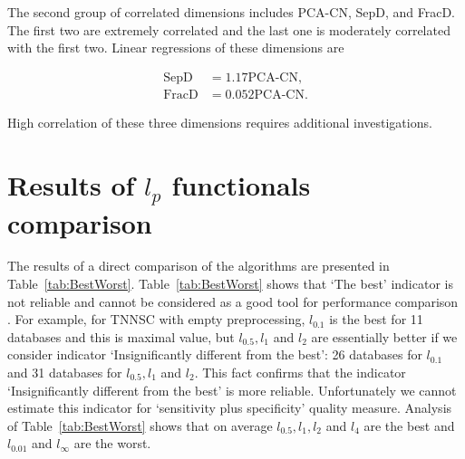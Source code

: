 \documentclass[entropy,article,submit,moreauthors,pdftex]{Definitions/mdpi}
\begin{document}
The second group of correlated dimensions includes PCA-CN, SepD, and FracD. The first two are extremely correlated and the last one is moderately correlated with the first two. Linear regressions of these dimensions are

\begin{equation*}
\begin{split}
\text{SepD} &= 1.17 \text{PCA-CN},\\
\text{FracD} &= 0.052 \text{PCA-CN}.
\end{split}
\end{equation*}

High correlation of these three dimensions requires additional investigations.

\section{Results of $l_p$ functionals comparison}
The results of a direct comparison of the algorithms are presented in Table~\ref{tab:BestWorst}. Table~\ref{tab:BestWorst} shows that `The best' indicator is not reliable and cannot be considered as a good tool for performance comparison \cite{demvsar2006statistical}. For example, for TNNSC with empty preprocessing, $l_{0.1}$ is the best for 11 databases and this is maximal value, but $l_{0.5}, l_1$ and $l_2$ are essentially better if we consider indicator `Insignificantly different from the best': 26 databases for $l_{0.1}$ and 31 databases for $l_{0.5}, l_1$ and $l_2$. This fact confirms that the indicator `Insignificantly different from the best' is more reliable. Unfortunately we cannot estimate this indicator for `sensitivity plus specificity' quality measure. Analysis of Table~\ref{tab:BestWorst} shows that on average $l_{0.5}, l_1, l_2$ and $l_4$ are the best and $l_{0.01}$ and $l_\infty$ are the worst.
\end{document}
